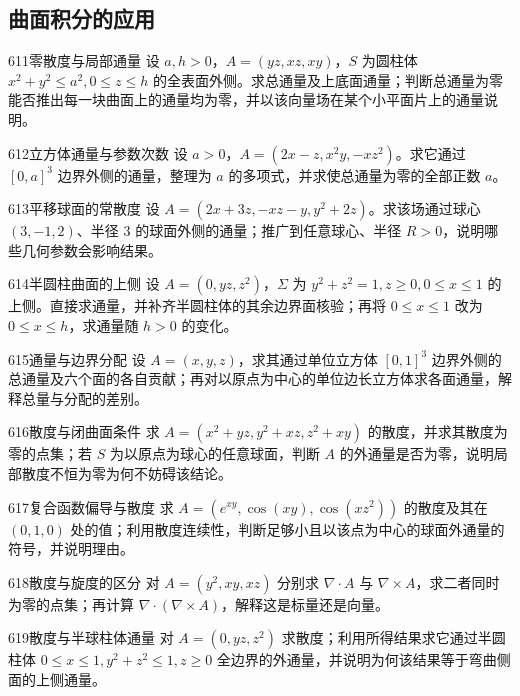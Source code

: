 \subsection{曲面积分的应用}
\begin{exercise}{611}{零散度与局部通量}
设 $a,h>0$，$A=(yz,xz,xy)$，$S$ 为圆柱体 $x^2+y^2\le a^2,0\le z\le h$ 的全表面外侧。求总通量及上底面通量；判断总通量为零能否推出每一块曲面上的通量均为零，并以该向量场在某个小平面片上的通量说明。
\end{exercise}
\begin{exercise}{612}{立方体通量与参数次数}
设 $a>0$，$A=(2x-z,x^2y,-xz^2)$。求它通过 $[0,a]^3$ 边界外侧的通量，整理为 $a$ 的多项式，并求使总通量为零的全部正数 $a$。
\end{exercise}
\begin{exercise}{613}{平移球面的常散度}
设 $A=(2x+3z,-xz-y,y^2+2z)$。求该场通过球心 $(3,-1,2)$、半径 $3$ 的球面外侧的通量；推广到任意球心、半径 $R>0$，说明哪些几何参数会影响结果。
\end{exercise}
\begin{exercise}{614}{半圆柱曲面的上侧}
设 $A=(0,yz,z^2)$，$\Sigma$ 为 $y^2+z^2=1,z\ge0,0\le x\le1$ 的上侧。直接求通量，并补齐半圆柱体的其余边界面核验；再将 $0\le x\le1$ 改为 $0\le x\le h$，求通量随 $h>0$ 的变化。
\end{exercise}
\begin{exercise}{615}{通量与边界分配}
设 $A=(x,y,z)$，求其通过单位立方体 $[0,1]^3$ 边界外侧的总通量及六个面的各自贡献；再对以原点为中心的单位边长立方体求各面通量，解释总量与分配的差别。
\end{exercise}
\begin{exercise}{616}{散度与闭曲面条件}
求 $A=(x^2+yz,y^2+xz,z^2+xy)$ 的散度，并求其散度为零的点集；若 $S$ 为以原点为球心的任意球面，判断 $A$ 的外通量是否为零，说明局部散度不恒为零为何不妨碍该结论。
\end{exercise}
\begin{exercise}{617}{复合函数偏导与散度}
求 $A=(e^{xy},\cos(xy),\cos(xz^2))$ 的散度及其在 $(0,1,0)$ 处的值；利用散度连续性，判断足够小且以该点为中心的球面外通量的符号，并说明理由。
\end{exercise}
\begin{exercise}{618}{散度与旋度的区分}
对 $A=(y^2,xy,xz)$ 分别求 $\nabla\cdot A$ 与 $\nabla\times A$，求二者同时为零的点集；再计算 $\nabla\cdot(\nabla\times A)$，解释这是标量还是向量。
\end{exercise}
\begin{exercise}{619}{散度与半球柱体通量}
对 $A=(0,yz,z^2)$ 求散度；利用所得结果求它通过半圆柱体 $0\le x\le1,y^2+z^2\le1,z\ge0$ 全边界的外通量，并说明为何该结果等于弯曲侧面的上侧通量。
\end{exercise}
